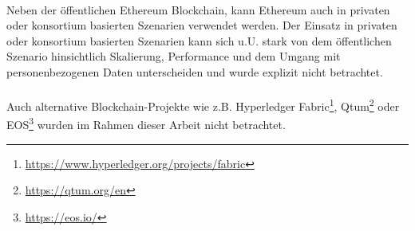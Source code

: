 \paragraph*{}
Neben der öffentlichen Ethereum Blockchain, kann Ethereum auch in privaten oder konsortium basierten Szenarien verwendet werden. Der Einsatz in privaten oder konsortium basierten Szenarien kann sich u.U. stark von dem öffentlichen Szenario hinsichtlich Skalierung, Performance und dem Umgang mit personenbezogenen Daten unterscheiden und wurde explizit nicht betrachtet.

\paragraph*{}
Auch alternative Blockchain-Projekte wie z.B. 
Hyperledger Fabric\footnote{\url{https://www.hyperledger.org/projects/fabric}}, 
Qtum\footnote{\url{https://qtum.org/en}}
oder EOS\footnote{\url{https://eos.io/}}
wurden im Rahmen dieser Arbeit nicht betrachtet. 